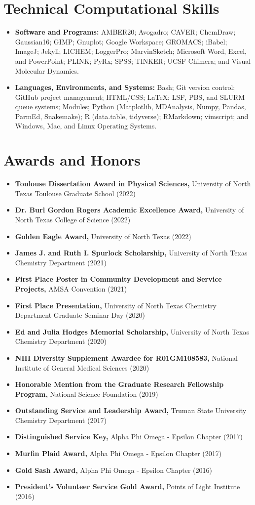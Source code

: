 \documentclass[letterpaper,11pt]{article}
\newcommand{\resumeItem}[2]{
  \item
    \textbf{#1}{ #2 \vspace{-2pt}}
}
\newcommand{\commaSubItem}[2]{\resumeItem{#1\textnormal{,}} {#2}\vspace{-4pt}}
\newcommand{\positionSubItem}[2]{\resumeItem{#1\textnormal{:}} {#2}\vspace{-4pt}}
\newcommand{\resumeSubHeadingListStart}{\begin{itemize}[leftmargin=*]}
\newcommand{\resumeSubHeadingListEnd}{\end{itemize}}
\begin{document}

\section{Technical Computational Skills}
  \resumeSubHeadingListStart
    \positionSubItem{Software and Programs}
      {AMBER20; Avogadro; CAVER; ChemDraw; Gaussian16; GIMP; Gnuplot; Google Workspace; GROMACS; iBabel; ImageJ; Jekyll; LICHEM; LoggerPro; MarvinSketch; Microsoft Word, Excel, and PowerPoint; PLINK; PyRx; SPSS; TINKER; UCSF Chimera; and Visual Molecular Dynamics.}
      \positionSubItem{Languages, Environments, and Systems}
      {Bash; Git version control; GitHub project management; HTML/CSS; \LaTeX; LSF, PBS, and SLURM queue systems; Modules; Python (Matplotlib, MDAnalysis, Numpy, Pandas, ParmEd, Snakemake); R (data.table, tidyverse); RMarkdown; vimscript; and Windows, Mac, and Linux Operating Systems.}
\resumeSubHeadingListEnd

\section{Awards and Honors}
  \resumeSubHeadingListStart
   \commaSubItem{Toulouse Dissertation Award in Physical Sciences}
      {University of North Texas Toulouse Graduate School (2022)}
   \commaSubItem{Dr. Burl Gordon Rogers Academic Excellence Award}
      {University of North Texas College of Science (2022)}
   \commaSubItem{Golden Eagle Award}
      {University of North Texas (2022)}
   \commaSubItem{James J. and Ruth I. Spurlock Scholarship}
      {University of North Texas Chemistry Department (2021)}
   \commaSubItem{First Place Poster in Community Development and Service Projects}
      {AMSA Convention (2021)}
   \commaSubItem{First Place Presentation}
      {University of North Texas Chemistry Department Graduate Seminar Day (2020)}
   \commaSubItem{Ed and Julia Hodges Memorial Scholarship}
      {University of North Texas Chemistry Department (2020)}
   \commaSubItem{NIH Diversity Supplement Awardee for R01GM108583}
      {National Institute of General Medical Sciences (2020)}
   \commaSubItem{Honorable Mention from the Graduate Research Fellowship Program}
      {National Science Foundation (2019)}
    \commaSubItem{Outstanding Service and Leadership Award}
      {Truman State University Chemistry Department (2017)}
    \commaSubItem{Distinguished Service Key}
      {Alpha Phi Omega - Epsilon Chapter (2017)}
    \commaSubItem{Murfin Plaid Award}
      {Alpha Phi Omega - Epsilon Chapter (2017)}
    \commaSubItem{Gold Sash Award}
      {Alpha Phi Omega - Epsilon Chapter (2016)}
    \commaSubItem{President's Volunteer Service Gold Award}
      {Points of Light Institute (2016)}
  \resumeSubHeadingListEnd
\end{document}
